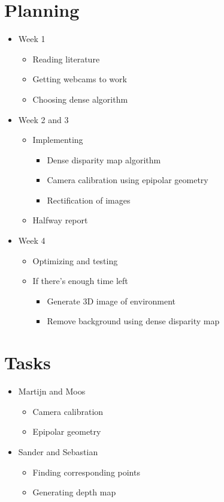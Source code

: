 \documentclass[a4paper]{article}
\begin{document}
\newpage
\section{Planning}
\begin{itemize}
  \item Week 1
    \begin{itemize}
      \item Reading literature
      \item Getting webcams to work
      \item Choosing dense algorithm
    \end{itemize}
  \item Week 2 and 3
    \begin{itemize}
      \item Implementing
        \begin{itemize}
          \item Dense disparity map algorithm
          \item Camera calibration using epipolar geometry
          \item Rectification of images
        \end{itemize}
      \item Halfway report
    \end{itemize}
  \item Week 4
    \begin{itemize}
      \item Optimizing and testing
      \item If there's enough time left
        \begin{itemize}
          \item Generate 3D image of environment
          \item Remove background using dense disparity map
        \end{itemize}
    \end{itemize}
\end{itemize}

\section{Tasks}
  \begin{itemize}
    \item Martijn and Moos
    \begin{itemize}
      \item Camera calibration
      \item Epipolar geometry
    \end{itemize}
    \item Sander and Sebastian
    \begin{itemize}
      \item Finding corresponding points
      \item Generating depth map
    \end{itemize}
  \end{itemize}



\end{document}
